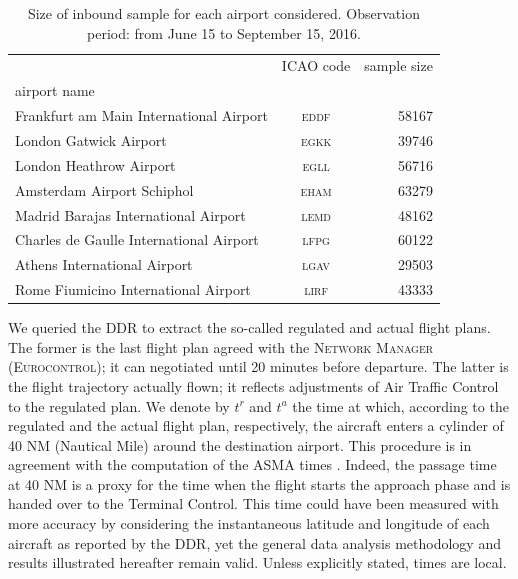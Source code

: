 \documentclass[draft,review]{elsarticle}
\newcommand{\airp}[1]{\textcolor{#1}{\textsc{#1}}}
\begin{document}
\begin{table}[tbp]
  \caption{Size of inbound sample for each airport considered. Observation period: from June 15 to September 15, 2016.}\label{tab:flights_count}
    \begin{tabular}{lcr}
      \toprule
      {} & \acs{ICAO} code &  sample size \\
      airport name                                       &                 &              \\
      \midrule
      Frankfurt am Main International Airport &     \airp{eddf} &        58167 \\
      London Gatwick Airport                  &     \airp{egkk} &        39746 \\
      London Heathrow Airport                 &     \airp{egll} &        56716 \\
      Amsterdam Airport Schiphol              &     \airp{eham} &        63279 \\
      Madrid Barajas International Airport    &     \airp{lemd} &        48162 \\
      Charles de Gaulle International Airport &     \airp{lfpg} &        60122 \\
      Athens International Airport            &     \airp{lgav} &        29503 \\
      Rome Fiumicino International Airport    &     \airp{lirf} &        43333 \\
      \bottomrule
    \end{tabular}
\end{table}

We queried the \ac{DDR} to extract the so-called regulated and actual flight plans.
The former is the last flight plan agreed with the \textsc{Network Manager (Eurocontrol)}; it can negotiated until 20 minutes before departure. The latter is the flight trajectory actually flown; it reflects adjustments of Air Traffic Control to the regulated plan.
We denote by \(t^r\) and \(t^a\) the time at which, according to the regulated and the actual flight plan, respectively, the aircraft enters a cylinder of 40 NM (Nautical Mile) around the destination airport.
This procedure is in agreement with the computation of the \ac{ASMA} times \citep{ASMA-def}.
Indeed, the passage time at 40 NM is a proxy for the time when the flight starts the approach phase and is handed over to the Terminal Control.
This time could have been measured with more accuracy by considering the instantaneous latitude and longitude of each aircraft as reported by the \ac{DDR}, yet the general data analysis methodology and results illustrated hereafter remain valid.
Unless explicitly stated, times are local.
\end{document}
